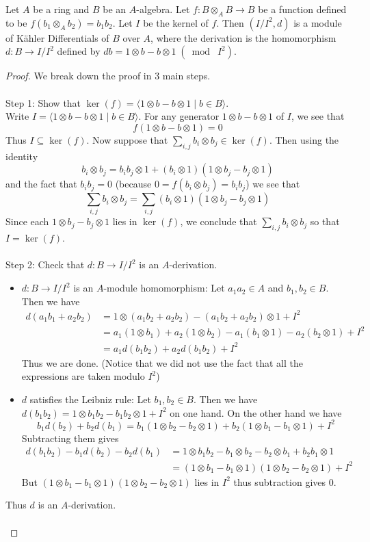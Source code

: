 \documentclass[a4paper]{article}
\begin{document}
\begin{prp}{}{} Let $A$ be a ring and $B$ be an $A$-algebra. Let $f:B\otimes_A B\to B$ be a function defined to be $f(b_1\otimes_A b_2)=b_1b_2$. Let $I$ be the kernel of $f$. Then $(I/I^2,d)$ is a module of Kähler Differentials of $B$ over $A$, where the derivation is the homomorphism $d:B\to I/I^2$ defined by $db=1\otimes b-b\otimes1\;(\bmod\;I^2)$. \tcbline
\begin{proof}
We break down the proof in 3 main steps. \\~\\
Step 1: Show that $\ker(f)=\langle 1\otimes b-b\otimes 1\;|\;b\in B\rangle$. \\
Write $I=\langle 1\otimes b-b\otimes 1\;|\;b\in B\rangle$. For any generator $1\otimes b-b\otimes 1$ of $I$, we see that $$f(1\otimes b-b\otimes 1)=0$$ Thus $I\subseteq\ker(f)$. Now suppose that $\sum_{i,j} b_i\otimes b_j\in\ker(f)$. Then using the identity $$b_i\otimes b_j=b_ib_j\otimes 1+(b_i\otimes 1)(1\otimes b_j-b_j\otimes 1)$$ and the fact that $b_ib_j=0$ (because $0=f(b_i\otimes b_j)=b_ib_j$) we see that $$\sum_{i,j} b_i\otimes b_j=\sum_{i,j}(b_i\otimes 1)(1\otimes b_j-b_j\otimes 1)$$ Since each $1\otimes b_j-b_j\otimes 1$ lies in $\ker(f)$, we conclude that $\sum_{i,j}b_i\otimes b_j$ so that $I=\ker(f)$. \\~\\
Step 2: Check that $d:B\to I/I^2$ is an $A$-derivation. \\
\begin{itemize}
\item $d:B\to I/I^2$ is an $A$-module homomorphism: Let $a_1a_2\in A$ and $b_1,b_2\in B$. Then we have 
\begin{align*}
d(a_1b_1+a_2b_2)&=1\otimes (a_1b_2+a_2b_2)-(a_1b_2+a_2b_2)\otimes 1+I^2\\
&=a_1(1\otimes b_1)+a_2(1\otimes b_2)-a_1(b_1\otimes 1)-a_2(b_2\otimes 1)+I^2\\
&=a_1d(b_1b_2)+a_2d(b_1b_2)+I^2
\end{align*}
Thus we are done. (Notice that we did not use the fact that all the expressions are taken modulo $I^2$)
\item $d$ satisfies the Leibniz rule: Let $b_1,b_2\in B$. Then we have $d(b_1b_2)=1\otimes b_1b_2-b_1b_2\otimes 1+I^2$ on one hand. On the other hand we have $$b_1d(b_2)+b_2d(b_1)=b_1(1\otimes b_2-b_2\otimes 1)+b_2(1\otimes b_1-b_1\otimes 1)+I^2$$ Subtracting them gives 
\begin{align*}
d(b_1b_2)-b_1d(b_2)-b_2d(b_1)&=1\otimes b_1b_2-b_1\otimes b_2-b_2\otimes b_1+b_2b_1\otimes 1\\
&=(1\otimes b_1-b_1\otimes 1)(1\otimes b_2-b_2\otimes 1)+I^2
\end{align*}
But $(1\otimes b_1-b_1\otimes 1)(1\otimes b_2-b_2\otimes 1)$ lies in $I^2$ thus subtraction gives $0$. 
\end{itemize}
Thus $d$ is an $A$-derivation. \\~\\


\end{proof}
\end{prp}
\end{document}
